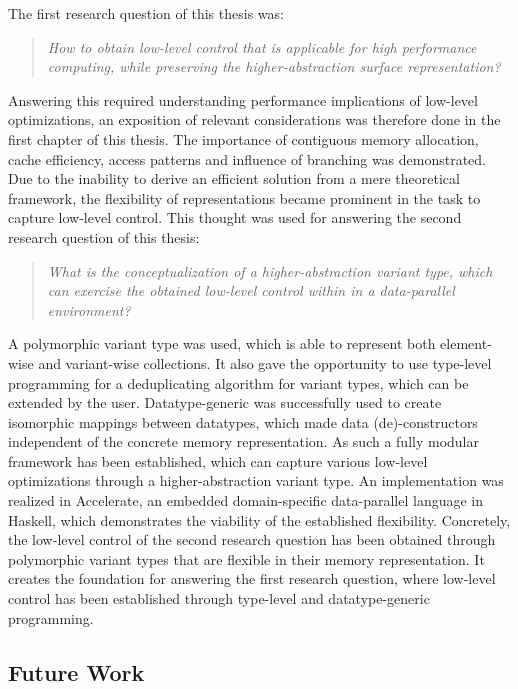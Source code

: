 \documentclass{article}
\begin{document}
The first research question of this thesis was:

\begin{quote}
{\it How to obtain low-level control that is applicable for high performance computing, while preserving the higher-abstraction surface representation?}
\end{quote}

Answering this required understanding performance implications of low-level optimizations, an exposition of relevant considerations was therefore done in the first chapter of this thesis.
The importance of contiguous memory allocation, cache efficiency, access patterns and influence of branching was demonstrated.
Due to the inability to derive an efficient solution from a mere theoretical framework, the flexibility of representations became prominent in the task to capture low-level control.  
This thought was used for answering the second research question of this thesis:

\begin{quote}
{\it What is the conceptualization of a higher-abstraction variant type, which can exercise the obtained low-level control within in a data-parallel environment?}
\end{quote}

A polymorphic variant type was used, which is able to represent both element-wise and variant-wise collections.
It also gave the opportunity to use type-level programming for a deduplicating algorithm for variant types, which can be extended by the user.
Datatype-generic was successfully used to create isomorphic mappings between datatypes, which made data (de)-constructors independent of the concrete memory representation.
As such a fully modular framework has been established, which can capture various low-level optimizations through a higher-abstraction variant type.
An implementation was realized in Accelerate, an embedded domain-specific data-parallel language in Haskell, which demonstrates the viability of the established flexibility.
Concretely, the low-level control of the second research question has been obtained through polymorphic variant types that are flexible in their memory representation.
It creates the foundation for answering the first research question, where low-level control has been established through type-level and datatype-generic programming. 

\subsection{Future Work}
\end{document}

